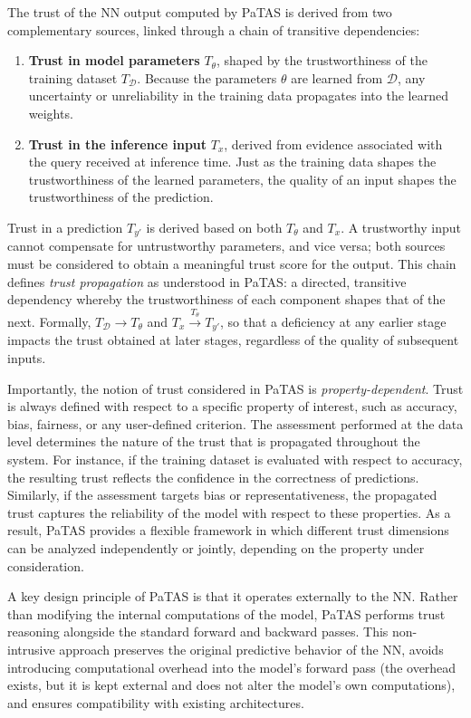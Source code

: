 The trust of the \ac{NN} output computed by \ac{PaTAS} is derived from two complementary sources, linked through a chain of transitive dependencies:
\begin{enumerate}
    \item \textbf{Trust in model parameters} $T_\theta$, shaped by the trustworthiness of the training dataset $T_{\mathcal{D}}$. Because the parameters $\theta$ are learned from $\mathcal{D}$, any uncertainty or unreliability in the training data propagates into the learned weights.
    
    \item \textbf{Trust in the inference input} $T_{x}$, derived from evidence associated with the query received at inference time. Just as the training data shapes the trustworthiness of the learned parameters, the quality of an input shapes the trustworthiness of the prediction.
\end{enumerate}

\noindent Trust in a prediction $T_{y'}$ is derived based on both $T_\theta$ and $T_x$. A trustworthy input cannot compensate for untrustworthy parameters, and vice versa; both sources must be considered to obtain a meaningful trust score for the output. This chain defines \emph{trust propagation} as understood in \ac{PaTAS}: a directed, transitive dependency whereby the trustworthiness of each component shapes that of the next. Formally, $T_{\mathcal{D}} \rightarrow T_\theta $ and $T_x \xrightarrow{T_\theta } T_{y'}$, so that a deficiency at any earlier stage impacts the trust obtained at later stages, regardless of the quality of subsequent inputs.

Importantly, the notion of trust considered in \ac{PaTAS} is \emph{property-dependent}. Trust is always defined with respect to a specific property of interest, such as accuracy, bias, fairness, or any user-defined criterion. The assessment performed at the data level determines the nature of the trust that is propagated throughout the system. For instance, if the training dataset is evaluated with respect to accuracy, the resulting trust reflects the confidence in the correctness of predictions. Similarly, if the assessment targets bias or representativeness, the propagated trust captures the reliability of the model with respect to these properties. As a result, \ac{PaTAS} provides a flexible framework in which different trust dimensions can be analyzed independently or jointly, depending on the property under consideration.

A key design principle of \ac{PaTAS} is that it operates externally to the \ac{NN}. Rather than modifying the internal computations of the model, \ac{PaTAS} performs trust reasoning alongside the standard forward and backward passes. This non-intrusive approach preserves the original predictive behavior of the \ac{NN}, avoids introducing computational overhead into the model's forward pass (the overhead exists, but it is kept external and does not alter the model's own computations), and ensures compatibility with existing architectures.

